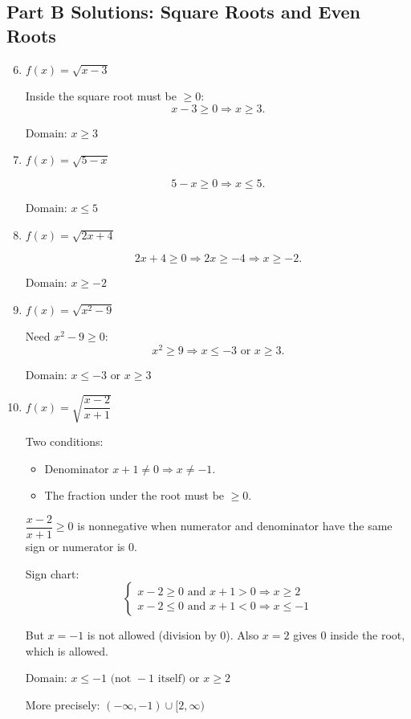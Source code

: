 \documentclass[14pt]{extarticle}
\begin{document}
\subsection*{Part B Solutions: Square Roots and Even Roots}
\begin{enumerate}
  \setcounter{enumi}{5}
  \item \(f(x) = \sqrt{x - 3}\)

  Inside the square root must be \(\ge 0\):
  \[
  x - 3 \ge 0 \Rightarrow x \ge 3.
  \]

  \(\boxed{\text{Domain: } x \ge 3}\)

  \item \(f(x) = \sqrt{5 - x}\)

  \[
  5 - x \ge 0 \Rightarrow x \le 5.
  \]

  \(\boxed{\text{Domain: } x \le 5}\)

  \item \(f(x) = \sqrt{2x + 4}\)

  \[
  2x + 4 \ge 0 \Rightarrow 2x \ge -4 \Rightarrow x \ge -2.
  \]

  \(\boxed{\text{Domain: } x \ge -2}\)

  \item \(f(x) = \sqrt{x^2 - 9}\)

  Need \(x^2 - 9 \ge 0\):
  \[
  x^2 \ge 9 \Rightarrow x \le -3 \text{ or } x \ge 3.
  \]

  \(\boxed{\text{Domain: } x \le -3 \text{ or } x \ge 3}\)

  \item \(f(x) = \sqrt{\dfrac{x - 2}{x + 1}}\)

  Two conditions:
  \begin{itemize}
    \item Denominator \(x + 1 \ne 0 \Rightarrow x \ne -1.\)
    \item The fraction under the root must be \(\ge 0.\)
  \end{itemize}

  \(\dfrac{x - 2}{x + 1} \ge 0\) is nonnegative when numerator and denominator have the same sign or numerator is 0.

  Sign chart:
  \[
  \begin{cases}
  x - 2 \ge 0 \text{ and } x + 1 > 0 \Rightarrow x \ge 2 \\
  x - 2 \le 0 \text{ and } x + 1 < 0 \Rightarrow x \le -1
  \end{cases}
  \]

  But \(x = -1\) is not allowed (division by 0).  
  Also \(x = 2\) gives 0 inside the root, which is allowed.

  \(\boxed{\text{Domain: } x \le -1 \text{ (not } -1\text{ itself)} \text{ or } x \ge 2}\)

  More precisely:
  \(\boxed{(-\infty, -1) \cup [2, \infty)}\)
\end{enumerate}
\end{document}
